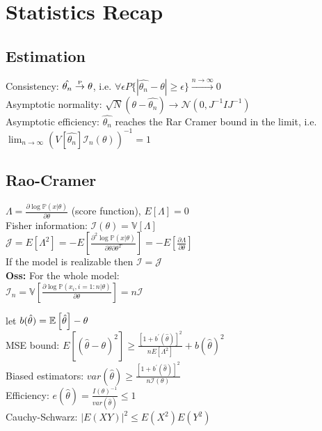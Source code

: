 \section{Statistics Recap}
\subsection*{Estimation}
Consistency: $\hat{\theta_n} \stackrel{\text{\tiny P}}{\rightarrow} \theta$,
i.e. $\forall\epsilon P \{|\hat{\theta_n}-\theta| \geq\epsilon\} \stackrel{n \to\infty}{\longrightarrow} 0 $\\
Asymptotic normality: $\sqrt{N}(\theta - \hat{\theta_n}) \to \mathcal{N}(0, J^{-1}IJ^{-1})$ \\
Asymptotic efficiency: $\hat{\theta_n}$ reaches the Rar Cramer bound in the limit, i.e. $\lim_{n\to\infty} (V[\hat{\theta_n}]\mathcal{I}_n(\theta))^{-1} = 1$
\subsection*{Rao-Cramer}
$\Lambda = \frac{\partial \log \mathbb{P}(x|\theta )}{\partial \theta}$ (score function), $E[\Lambda ]=0$\\
Fisher information: $\mathcal{I}(\theta)= \mathbb{V}[\Lambda]$ \\
$\mathcal{J}= E[\Lambda^{2}]= -E[\frac{\partial^2 \log \mathbb{P}(x|\theta ) }{\partial \theta \partial \theta ^{T}}]= -E[\frac{\partial \Lambda}{\partial \theta}]$ \\
If the model is realizable then $\mathcal{I}=\mathcal{J}$ \\
\textbf{Oss:} For the whole model:\\ $\mathcal{I}_n = \mathbb{V}\left[\frac{\partial \log \mathbb{P}(x_i, i=1:n|\theta )}{\partial \theta}\right]=n\mathcal{I}$

let $b(\hat\theta) = \mathbb{E}\left[\hat\theta\right]-\theta$\\
MSE bound: $E[(\hat \theta -\theta )^{2}] \geq \frac{[1 + b^{\prime} (\hat\theta)]^{2}}{n E[\Lambda ^{2}]} + {b(\hat\theta)}^{2}$ \\
Biased estimators: $var(\hat{\theta}) \geq \frac{[1 + b^{\prime}(\hat\theta)]^2}{n\mathcal{I}(\theta)}$ \\
Efficiency: $e(\hat{\theta}) = \frac{I(\theta)^{-1}}{var(\hat{\theta})} \leq 1$ \\
Cauchy-Schwarz: $|E(XY)|^2 \leq E(X^2) E(Y^2)$ 


